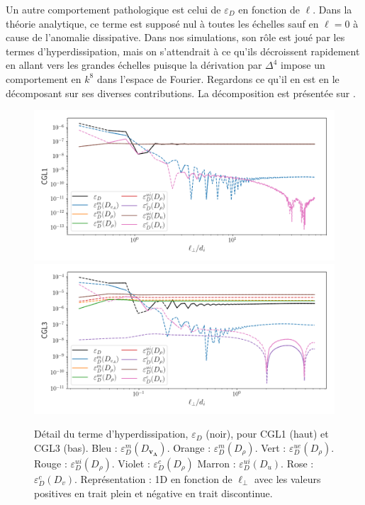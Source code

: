   Un autre comportement pathologique est celui de $\varepsilon_{D}$ en fonction de $\ell$. Dans la théorie analytique, ce terme est supposé nul à toutes les échelles sauf en $\ell = 0$ à cause de l'anomalie dissipative. Dans nos simulations, son rôle est joué par les termes d'hyperdissipation, mais on s'attendrait à ce qu'ils décroissent rapidement en allant vers les grandes échelles puisque la dérivation par $\Delta^4$ impose un comportement en $k^8$ dans l'espace de Fourier. Regardons ce qu'il en est en le décomposant sur ses diverses contributions. La décomposition est présentée sur . 
\begin{figure}[!ht]
 \centering
\includegraphics[width=0.9\linewidth,trim=0cm 0cm 0cm 0cm, clip=true]{./Part_3/images_ch2/CGL1_1D_lperp_dissl}
\includegraphics[width=0.9\linewidth,trim=0cm 0cm 0cm 0cm, clip=true]{./Part_3/images_ch2/CGL3_1D_lperp_dissl}
\cprotect\caption{Détail du terme d'hyperdissipation, $\varepsilon_{D}$ (noir), pour CGL1 (haut) et CGL3 (bas). Bleu : $\varepsilon^m_{D}(D_{\boldsymbol{v_A}})$. Orange :  $\varepsilon^m_{D}(D_{\rho})$. Vert :  $\varepsilon^{ue}_{D}(D_{\rho})$. Rouge : $\varepsilon^{ui}_{D}(D_{\rho})$. Violet :  $\varepsilon^c_{D}(D_{\rho})$ Marron :  $\varepsilon^{ui}_{D}(D_{u})$. Rose :  $\varepsilon^c_{D}(D_{v})$. Représentation : \acs{1D} en fonction de $\ell_{\perp}$ avec les valeurs positives en trait plein et négative en trait discontinue.}
\label{fig:DISS}
\end{figure}
